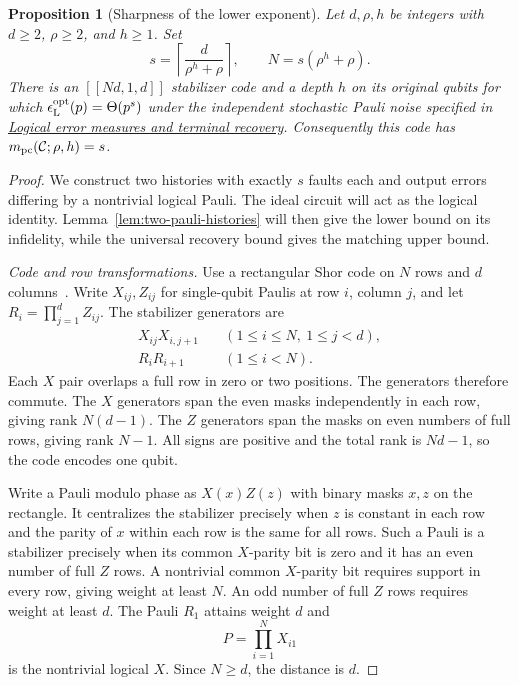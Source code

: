 \documentclass[aps,prl,reprint,longbibliography,nofootinbib,nobibnotes]{revtex4-2}
\newtheorem{proposition}{Proposition}
\newif\ifshowchanges
\DeclareRobustCommand{\rev}[1]{\leavevmode{\ifshowchanges\color{RevisionPurple}%
  \hypersetup{allcolors=RevisionPurple}\fi #1%
  \ifhmode\xdef\revspacefactor{\the\spacefactor}%
    \aftergroup\revrestorespacefactor\fi}}
\newcommand{\revrestorespacefactor}{\ifhmode\spacefactor\revspacefactor\relax\fi}
\begin{document}
\begin{proposition}[Sharpness of the lower exponent]
\label{prop:lower-saturation}
Let $d,\rho,h$ be integers with $d\ge2$, $\rho\ge2$, and $h\ge1$. Set
\begin{equation}\label{em:lower-parameters}
 s=\left\lceil\frac{d}{\rho^h+\rho}\right\rceil,\qquad
 N=s(\rho^h+\rho).
\end{equation}
There is an $[[Nd,1,d]]$ stabilizer code  and a \rev{circuit of} depth $h$ on its original qubits
for which
$\epsilon_{\rm L}^{\rm opt}(p)=\Theta(p^s)$ under the independent stochastic Pauli noise specified
in \hyperref[sm:logical-error-measures]{Logical error measures and terminal recovery}. Consequently
this code has $m_{\rm pc}(\mathcal C;\rho,h)=s$.
\end{proposition}

\begin{proof}
We construct two histories with exactly $s$ faults each and output errors differing by a nontrivial
logical Pauli. The ideal circuit will act as the logical identity.
Lemma~\ref{lem:two-pauli-histories} will then give the lower bound on its infidelity, while the
universal recovery bound gives the matching upper bound.

\emph{Code and row transformations.}
Use a rectangular Shor code on $N$ rows and $d$ columns~\cite{BaconCasaccino}. Write
$X_{ij},Z_{ij}$ for single-qubit Paulis at row $i$, column $j$, and let $R_i=\prod_{j=1}^d Z_{ij}$.
The stabilizer generators are
\begin{align}
 X_{ij}X_{i,j+1}
 &\quad (1\le i\le N,\ 1\le j<d),\nonumber\\
 R_iR_{i+1}
 &\quad (1\le i<N).
 \label{em:lower-stabilizers}
\end{align}
Each $X$ pair overlaps a full row in zero or two positions. The generators therefore commute. The
$X$ generators span the even masks independently in each row, giving rank $N(d-1)$. The $Z$
generators span the masks on even numbers of full rows, giving rank $N-1$. All signs are positive
and the total rank is $Nd-1$, so the code encodes one qubit.

Write a Pauli modulo phase as $X(x)Z(z)$ with binary masks $x,z$ on the rectangle. It centralizes
the stabilizer precisely when $z$ is constant in each row and the parity of $x$ within each row is
the same for all rows. Such a Pauli is a stabilizer precisely when its common $X$-parity bit is
zero and it has an even number of full $Z$ rows. A nontrivial common $X$-parity bit requires
support in every row, giving weight at least $N$. An odd number of full $Z$ rows requires weight at
least $d$. The Pauli $R_1$ attains weight $d$ and
\begin{equation}\label{em:lower-logical-X}
 P=\prod_{i=1}^N X_{i1}
\end{equation}
is the nontrivial logical $X$. Since $N\ge d$, the distance is $d$.


\end{proof}
\end{document}
